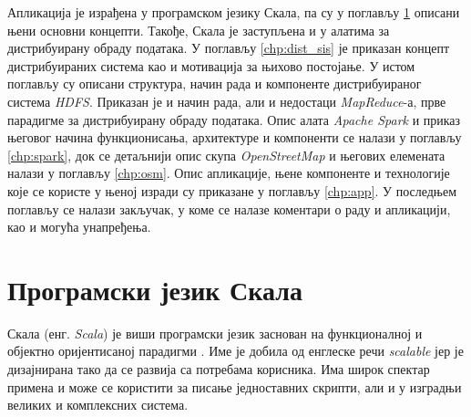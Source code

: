 \documentclass[12pt,oneside]{memoir}
\begin{document}
Апликација је израђена у програмском језику Скала, па су у поглављу \ref{chp:scala} описани њени основни концепти. Такође, Скала је заступљена и у алатима за дистрибуирану обраду података. У поглављу \ref{chp:dist_sis} је приказан концепт дистрибуираних система као и мотивација за њихово постојање. У истом поглављу су описани структура, начин рада и компоненте дистрибуираног система \textit{HDFS}. Приказан је и начин рада, али и недостаци \textit{MapReduce}-а, прве парадигме за дистрибуирану обраду података. Опис алата \textit{Apache Spark} и приказ његовог начина функционисања, архитектуре и компоненти се налази у поглављу \ref{chp:spark}, док се детаљнији опис скупа \textit{OpenStreetMap} и његових елемената налази у поглављу \ref{chp:osm}. Опис апликације, њене компоненте и технологије које се користе у њеној изради су приказане у поглављу \ref{chp:app}. У последњем поглављу се налази закључак, у коме се налазе коментари о раду и апликацији, као и могућа унапређења.

%
%

\chapter{Програмски језик Скала}
\label{chp:scala}

Скала (енг. \textit{Scala}) је виши програмски језик заснован на функционалној и објектно оријентисаној парадигми  \cite{scala_prog}. Име је добила од енглеске речи \textit{scalable} јер је дизајнирана тако да се развија са потребама корисника. Има широк спектар примена и може се користити за писање једноставних скрипти, али и у изградњи великих и комплексних система.
\end{document}
